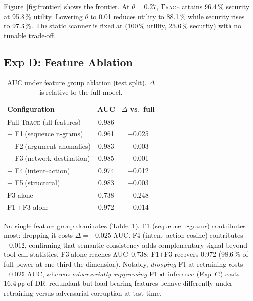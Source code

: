 \documentclass[conference]{IEEEtran}
\begin{document}
Figure~\ref{fig:frontier} shows the frontier.  At $\theta=0.27$,
\textsc{Trace} attains 96.4\,\% security at 95.8\,\% utility.
Lowering $\theta$ to 0.01 reduces utility to 88.1\,\% while
security rises to 97.3\,\%.  The static scanner is fixed at
(100\,\% utility, 23.6\,\% security) with no tunable trade-off.

\subsection{Exp D: Feature Ablation}
\label{sec:exp_d}

\begin{table}[t]
\centering
\caption{AUC under feature group ablation (test split).
  $\Delta$ is relative to the full model.}
\label{tab:ablation}
\begin{tabular}{lcc}
\toprule
Configuration & AUC & $\Delta$ vs.\ full \\
\midrule
Full \textsc{Trace} (all features)  & 0.986 & --- \\
\quad $-$ F1 (sequence n-grams)     & 0.961 & $-$0.025 \\
\quad $-$ F2 (argument anomalies)   & 0.983 & $-$0.003 \\
\quad $-$ F3 (network destination)  & 0.985 & $-$0.001 \\
\quad $-$ F4 (intent--action)       & 0.974 & $-$0.012 \\
\quad $-$ F5 (structural)           & 0.983 & $-$0.003 \\
\midrule
F3 alone                            & 0.738 & $-$0.248 \\
F1\,+\,F3 alone                     & 0.972 & $-$0.014 \\
\bottomrule
\end{tabular}
\end{table}

No single feature group dominates (Table~\ref{tab:ablation}).
F1 (sequence n-grams) contributes most: dropping it costs
$\Delta{=}{-}0.025$ AUC.  F4 (intent--action cosine) contributes
$-0.012$, confirming that semantic consistency adds complementary
signal beyond tool-call statistics.  F3 alone reaches AUC~0.738;
F1$+$F3 recovers 0.972 (98.6\,\% of full power at one-third the
dimension).  Notably, \emph{dropping} F1 at retraining costs
$-0.025$ AUC, whereas \emph{adversarially suppressing} F1 at
inference (Exp~G) costs 16.4\,pp of DR: redundant-but-load-bearing
features behave differently under retraining versus adversarial
corruption at test time.
\end{document}
